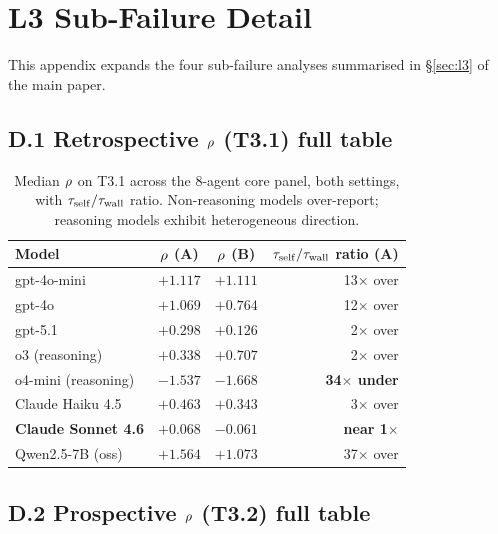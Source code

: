 
\section{L3 Sub-Failure Detail}
\label{app:l3-detail}

This appendix expands the four sub-failure analyses summarised in \S\ref{sec:l3} of the main paper.

\subsection*{D.1 Retrospective $\rho$ (T3.1) full table}

\begin{table}[h]
\centering
\caption{Median $\rho$ on T3.1 across the 8-agent core panel, both settings, with $\tau_{\mathrm{self}} / \tau_{\mathrm{wall}}$ ratio. Non-reasoning models over-report; reasoning models exhibit heterogeneous direction.}
\label{tab:l3-rho-retro}
\small
\begin{tabular}{lccr}
\toprule
Model & $\rho$ (A) & $\rho$ (B) & $\tau_{\mathrm{self}}/\tau_{\mathrm{wall}}$ ratio (A) \\
\midrule
gpt-4o-mini & $+1.117$ & $+1.111$ & 13$\times$ over \\
gpt-4o & $+1.069$ & $+0.764$ & 12$\times$ over \\
gpt-5.1 & $+0.298$ & $+0.126$ & 2$\times$ over \\
o3 (reasoning) & $+0.338$ & $+0.707$ & 2$\times$ over \\
o4-mini (reasoning) & $\mathbf{-1.537}$ & $\mathbf{-1.668}$ & \textbf{34$\times$ under} \\
Claude Haiku 4.5 & $+0.463$ & $+0.343$ & 3$\times$ over \\
\textbf{Claude Sonnet 4.6} & $\mathbf{+0.068}$ & $-0.061$ & \textbf{near 1$\times$} \\
Qwen2.5-7B (oss) & $+1.564$ & $+1.073$ & 37$\times$ over \\
\bottomrule
\end{tabular}
\end{table}

\subsection*{D.2 Prospective $\rho$ (T3.2) full table}

